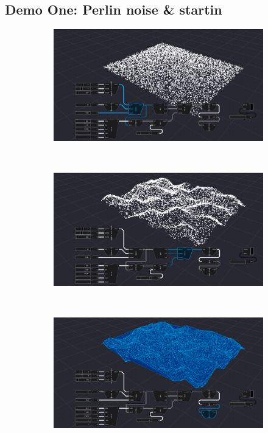 \subsection{Demo One: Perlin noise \& startin}

\graphicspath{{../../assets/images/6/demo/}}

\begin{figure}
  \centering
  \begin{subfigure}[b]{0.90\linewidth}
    \centering
    \includegraphics[width=\linewidth]{products-1.PNG}
    \caption{}\label{fig:in-between-products:a}
  \end{subfigure}%
  \\ 
  \begin{subfigure}[b]{0.90\linewidth}
    \centering
    \includegraphics[width=\linewidth]{products-2.PNG}
    \caption{}\label{fig:in-between-products:b}
  \end{subfigure}%
  \\
  \begin{subfigure}[b]{0.90\linewidth}
    \centering
    \includegraphics[width=\linewidth]{products-3.PNG}

\end{subfigure}
\end{figure}
